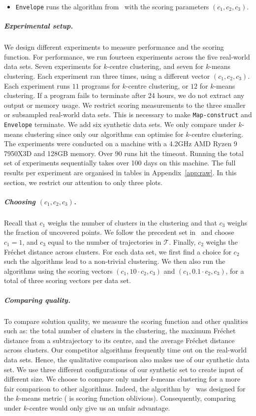 \documentclass[11pt]{article}
\newcommand{\frechet}{Fr\'{e}chet\xspace}
\begin{document}
%
\begin{itemize}
    \item \texttt{Envelope} runs the algorithm from~\cite{agarwal2018subtrajectory} with the scoring parameters $(c_1, c_2, c_3)$. 
\end{itemize}
%
%
%
%
%
\subparagraph{Experimental setup.}
We design different experiments to measure performance and the scoring function.  For performance, we run fourteen experiments across the five real-world data sets.
Seven experiments for $k$-centre clustering, and seven for $k$-means clustering. 
Each experiment ran three times, using a different vector $(c_1, c_2, c_3)$. 
Each experiment runs $11$ programs for $k$-centre clustering, or $12$ for $k$-means clustering. If a program fails to terminate after 24 hours, we do not extract any output or memory usage. 
%
We restrict scoring measurements to the three smaller or subsampled real-world data sets. This is necessary to make \texttt{Map-construct} and \texttt{Envelope} terminate.  We add six synthetic data sets. We only compare under $k$-means clustering since only our algorithms can optimise for $k$-centre clustering.  
The experiments were conducted on a machine with a 4.2GHz AMD Ryzen 9 7950X3D and 128GB memory.
Over 90 runs hit the timeout. 
Running the total set of experiments sequentially takes over 100 days on this machine. 
%
The full results per experiment are organised in tables in Appendix~\ref{app:raw}.
In this section, we restrict our attention to only three plots. 
%
%
\subparagraph{Choosing $(c_1, c_2, c_3)$.}
Recall that $c_1$ weighs the number of clusters in the clustering and that $c_3$ weighs the fraction of uncovered points. 
We follow the precedent set in~\cite{agarwal2018subtrajectory} and choose $c_1 = 1$, and $c_3$ equal to the number of trajectories in $\mathcal{T}$. 
Finally, $c_2$ weighs the \frechet distance across clusters. 
For each data set, we first find a choice for $c_2$ such the algorithms lead to a non-trivial clustering. We then also run the algorithms using the scoring vectors $(c_1, 10 \cdot  c_2, c_3)$ and $(c_1, 0.1 \cdot  c_2, c_3)$, for a total of three scoring vectors per data set. 
%
\subparagraph{Comparing quality.}
To compare solution quality, we measure the scoring function and other qualities such as: the total number of clusters in the clustering, the maximum \frechet distance from a subtrajectory to its centre, and the average \frechet distance across clusters. Our competitor algorithms frequently time out on the real-world data sets.
Hence, the qualitative comparison also makes use of our synthetic data set. We use three different configurations of our synthetic set to create input of different size. We choose to compare only under $k$-means clustering for a more fair comparison to other algorithms. Indeed, the algorithm by~\cite{agarwal2018subtrajectory} was designed for the $k$-means metric (\cite{buchin2020improved} is scoring function oblivious). 
Consequently, comparing under $k$-centre would only give us an unfair advantage.
%
%
\end{document}
